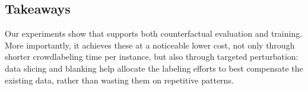 \subsection{Takeaways}
\label{subsec:label_takeaway}


Our experiments show that \sysname supports both counterfactual evaluation and training.
More importantly, it achieves these at a noticeable lower cost, not only through shorter crowdlabeling time per instance, but also through targeted perturbation: data slicing and blanking help allocate the labeling efforts to best compensate the existing data, rather than wasting them on repetitive patterns.

